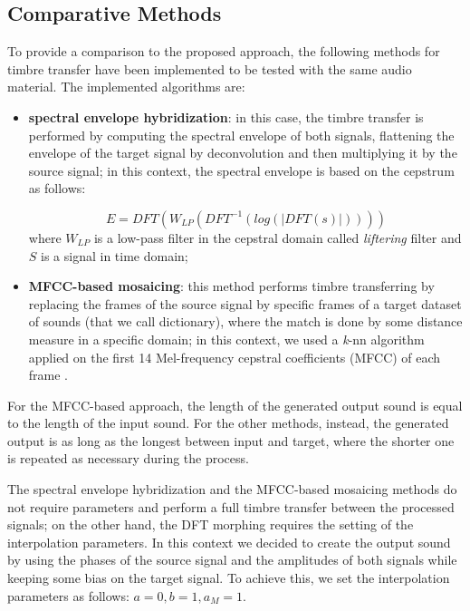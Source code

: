 \subsection{Comparative Methods}
\label{sec:comparative}

To provide a comparison to the proposed approach, the following methods for timbre transfer have been implemented to be tested with the same audio material. The implemented algorithms are:

\begin{itemize}
	\item \textbf{spectral envelope hybridization}: in this case, the timbre transfer is performed by computing  the spectral envelope of both signals, flattening the envelope of the target signal by deconvolution and then multiplying it by the source signal; in this context, the spectral envelope is based on the cepstrum as follows: 
	
	\begin{equation}
	E = DFT (W_{LP} (DFT^{-1} (log (|DFT (s)|))))
	\end{equation}
	where $W_{LP}$ is a low-pass filter in the cepstral domain called \textit{liftering} filter and $S$ is a signal in time domain;
	\item \textbf{MFCC-based mosaicing}: this method performs timbre transferring by replacing the frames of the source signal by specific frames of a target dataset of sounds (that we call dictionary), where the match is done by some distance measure in a specific domain; in this context, we used a \emph{k}-nn algorithm applied on the first 14 Mel-frequency cepstral coefficients (MFCC) of each frame \cite{Burred2014framework}.
\end{itemize}

For the MFCC-based approach, the length of the generated output sound is equal to the length of the input sound. For the other methods, instead, the generated output is as long as the longest between input and target, where the shorter one is repeated as necessary during the process. 

The spectral envelope hybridization and the MFCC-based mosaicing methods do not require parameters and perform a full timbre transfer between the processed signals; on the other hand, the DFT morphing requires the setting of the interpolation parameters. In this context we decided to create the output sound by using the phases of the source signal and the amplitudes of both signals while keeping some bias on the target signal. To achieve this, we set the interpolation parameters as follows: $a = 0, b = 1, a_{M} = 1$.

